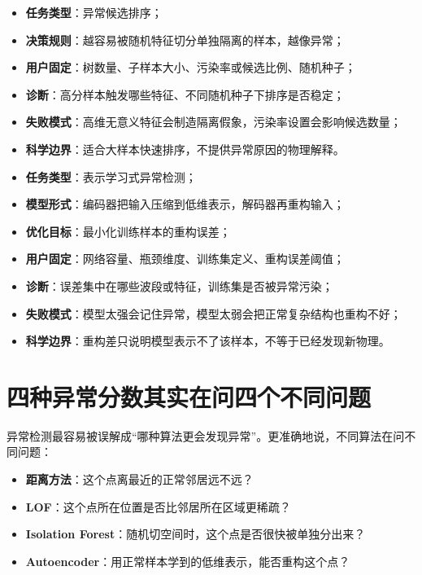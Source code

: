 \begin{examplebox}
\begin{itemize}
    \item \textbf{任务类型}：异常候选排序；
    \item \textbf{决策规则}：越容易被随机特征切分单独隔离的样本，越像异常；
    \item \textbf{用户固定}：树数量、子样本大小、污染率或候选比例、随机种子；
    \item \textbf{诊断}：高分样本触发哪些特征、不同随机种子下排序是否稳定；
    \item \textbf{失败模式}：高维无意义特征会制造隔离假象，污染率设置会影响候选数量；
    \item \textbf{科学边界}：适合大样本快速排序，不提供异常原因的物理解释。
\end{itemize}
\end{examplebox}

\begin{examplebox}
\begin{itemize}
    \item \textbf{任务类型}：表示学习式异常检测；
    \item \textbf{模型形式}：编码器把输入压缩到低维表示，解码器再重构输入；
    \item \textbf{优化目标}：最小化训练样本的重构误差；
    \item \textbf{用户固定}：网络容量、瓶颈维度、训练集定义、重构误差阈值；
    \item \textbf{诊断}：误差集中在哪些波段或特征，训练集是否被异常污染；
    \item \textbf{失败模式}：模型太强会记住异常，模型太弱会把正常复杂结构也重构不好；
    \item \textbf{科学边界}：重构差只说明模型表示不了该样本，不等于已经发现新物理。
\end{itemize}
\end{examplebox}

\section{四种异常分数其实在问四个不同问题}

异常检测最容易被误解成“哪种算法更会发现异常”。更准确地说，不同算法在问不同问题：

\begin{itemize}
    \item \textbf{距离方法}：这个点离最近的正常邻居远不远？
    \item \textbf{LOF}：这个点所在位置是否比邻居所在区域更稀疏？
    \item \textbf{Isolation Forest}：随机切空间时，这个点是否很快被单独分出来？
    \item \textbf{Autoencoder}：用正常样本学到的低维表示，能否重构这个点？
\end{itemize}

